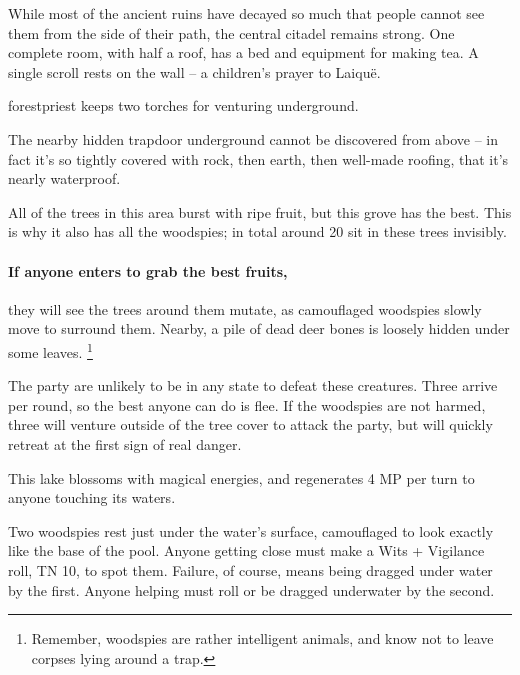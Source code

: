 \begin{multicols}{2}
\label{lost_citadel}
While most of the ancient ruins have decayed so much that people cannot see them from the side of their path, the central citadel remains strong.
One complete room, with half a roof, has a bed and equipment for making tea.
A single scroll rests on the wall -- a children's prayer to Laiqu\"{e}.

\Gls{forestpriest} keeps two torches for venturing underground.

The nearby hidden trapdoor underground cannot be discovered from above -- in fact it's so tightly covered with rock, then earth, then well-made roofing, that it's nearly waterproof.


All of the trees in this area burst with ripe fruit, but this grove has the best.
This is why it also has all the woodspies; in total around 20 sit in these trees invisibly.
\paragraph{If anyone enters to grab the best fruits,}
they will see the trees around them mutate, as camouflaged woodspies slowly move to surround them.
Nearby, a pile of dead deer bones is loosely hidden under some leaves.%
\footnote{Remember, woodspies are rather intelligent animals, and know not to leave corpses lying around a trap.}

The party are unlikely to be in any state to defeat these creatures.  Three arrive per round, so the best anyone can do is flee.  If the woodspies are not harmed, three will venture outside of the tree cover to attack the party, but will quickly retreat at the first sign of real danger.



This lake blossoms with magical energies, and regenerates 4 MP per turn to anyone touching its waters.

Two woodspies rest just under the water's surface, camouflaged to look exactly like the base of the pool.
Anyone getting close must make a Wits + Vigilance roll, TN 10, to spot them.
Failure, of course, means being dragged under water by the first.
Anyone helping must roll or be dragged underwater by the second.


\begin{boxtext}


\end{boxtext}
\end{multicols}
